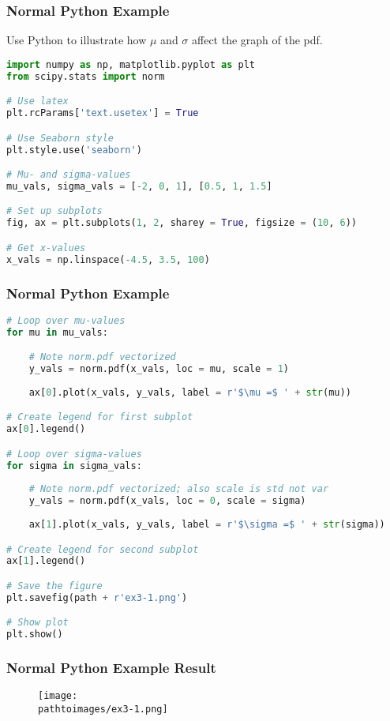 \documentclass{beamer}
\newcommand{\pathtoimages}{/Users/charlesrambo/Desktop/Bootcamp24/Images}
\begin{document}
\begin{frame}[fragile]
\frametitle{Normal Python Example}
\small
\begin{Example}
Use Python to illustrate how $\mu$ and $\sigma$ affect the graph of the pdf.
\end{Example}

\begin{lstlisting}[language=Python]
import numpy as np, matplotlib.pyplot as plt
from scipy.stats import norm

# Use latex
plt.rcParams['text.usetex'] = True

# Use Seaborn style
plt.style.use('seaborn')

# Mu- and sigma-values
mu_vals, sigma_vals = [-2, 0, 1], [0.5, 1, 1.5]

# Set up subplots
fig, ax = plt.subplots(1, 2, sharey = True, figsize = (10, 6))

# Get x-values
x_vals = np.linspace(-4.5, 3.5, 100)
\end{lstlisting}

\end{frame}

\begin{frame}[fragile]
\frametitle{Normal Python Example}
\begin{lstlisting}[language=Python]
# Loop over mu-values
for mu in mu_vals:

    # Note norm.pdf vectorized
    y_vals = norm.pdf(x_vals, loc = mu, scale = 1)
    
    ax[0].plot(x_vals, y_vals, label = r'$\mu =$ ' + str(mu))

# Create legend for first subplot
ax[0].legend()

# Loop over sigma-values
for sigma in sigma_vals:
    
    # Note norm.pdf vectorized; also scale is std not var
    y_vals = norm.pdf(x_vals, loc = 0, scale = sigma)
    
    ax[1].plot(x_vals, y_vals, label = r'$\sigma =$ ' + str(sigma))

# Create legend for second subplot
ax[1].legend()

# Save the figure
plt.savefig(path + r'ex3-1.png')

# Show plot
plt.show()
\end{lstlisting}

\end{frame}

\begin{frame}[fragile]
\frametitle{Normal Python Example Result}

\begin{figure}
\centering
\texttt{[image: \\pathtoimages/ex3-1.png]}
\end{figure}

\end{frame}
\end{document}
